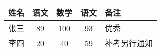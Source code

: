 \documentclass{ctexart}%
\begin{document}
    \begin{tabular}{|l|c|c|c|p{1.5cm}|}
    	\hline
        姓名 & 语文 & 数学 & 语文 & 备注 \\
        \hline 
        张三 & 89   & 100 & 93   & 优秀	\\
        \hline
        李四 & 20   & 40  & 59   & 补考另行通知 \\
        \hline
    \end{tabular}
\end{document}
